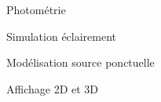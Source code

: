 \item[\textsc{\scriptsize [Phys]}] Photométrie
\item[\textsc{\scriptsize [Phys]}] Simulation éclairement
\item[\textsc{\scriptsize [Phys]}] Modélisation source ponctuelle
\item[\textsc{\scriptsize [Num]}] Affichage 2D et 3D